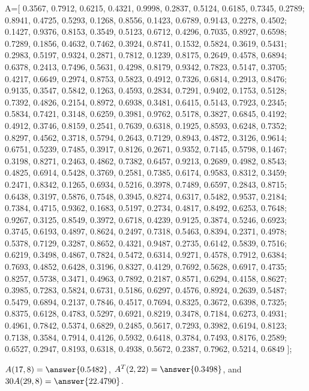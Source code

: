 \documentclass{ximera}
\begin{document}
\begin{exercise}
\begin{enumerate}
\begin{hint}
    A=[
  0.3567, 0.7912, 0.6215, 0.4321, 0.9998, 0.2837, 0.5124, 0.6185, 0.7345, 0.2789;
  0.8941, 0.4725, 0.5293, 0.1268, 0.8556, 0.1423, 0.6789, 0.9143, 0.2278, 0.4502;
  0.1427, 0.9376, 0.8153, 0.3549, 0.5123, 0.6712, 0.4296, 0.7035, 0.8927, 0.6598;
  0.7289, 0.1856, 0.4632, 0.7462, 0.3924, 0.8741, 0.1532, 0.5824, 0.3619, 0.5431;
  0.2983, 0.5197, 0.9324, 0.2871, 0.7812, 0.1239, 0.8175, 0.2649, 0.4578, 0.6894;
  0.6378, 0.2413, 0.7496, 0.5631, 0.4298, 0.8179, 0.9342, 0.7823, 0.5147, 0.3705;
  0.4217, 0.6649, 0.2974, 0.8753, 0.5823, 0.4912, 0.7326, 0.6814, 0.2913, 0.8476;
  0.9135, 0.3547, 0.5842, 0.1263, 0.4593, 0.2834, 0.7291, 0.9402, 0.1753, 0.5128;
  0.7392, 0.4826, 0.2154, 0.8972, 0.6938, 0.3481, 0.6415, 0.5143, 0.7923, 0.2345;
  0.5834, 0.7421, 0.3148, 0.6259, 0.3981, 0.9762, 0.5178, 0.3827, 0.6845, 0.4192;
  0.4912, 0.3746, 0.8159, 0.2541, 0.7639, 0.6318, 0.1925, 0.8593, 0.6248, 0.7352;
  0.8297, 0.4562, 0.3718, 0.5794, 0.2643, 0.7129, 0.8943, 0.4872, 0.3126, 0.9614;
  0.6751, 0.5239, 0.7485, 0.3917, 0.8126, 0.2671, 0.9352, 0.7145, 0.5798, 0.1467;
  0.3198, 0.8271, 0.2463, 0.4862, 0.7382, 0.6457, 0.9213, 0.2689, 0.4982, 0.8543;
  0.4825, 0.6914, 0.5428, 0.3769, 0.2581, 0.7385, 0.6174, 0.9583, 0.8312, 0.3459;
  0.2471, 0.8342, 0.1265, 0.6934, 0.5216, 0.3978, 0.7489, 0.6597, 0.2843, 0.8715;
  0.6438, 0.3197, 0.5876, 0.7548, 0.3945, 0.8274, 0.6317, 0.5482, 0.9537, 0.2184;
  0.7384, 0.4715, 0.9362, 0.1683, 0.5197, 0.2734, 0.4817, 0.8492, 0.6253, 0.7648;
  0.9267, 0.3125, 0.8549, 0.3972, 0.6718, 0.4239, 0.9125, 0.3874, 0.5246, 0.6923;
  0.3745, 0.6193, 0.4897, 0.8624, 0.2497, 0.7318, 0.5463, 0.8394, 0.2371, 0.4978;
  0.5378, 0.7129, 0.3287, 0.8652, 0.4321, 0.9487, 0.2735, 0.6142, 0.5839, 0.7516;
    0.6219, 0.3498, 0.4867, 0.7824, 0.5472, 0.6314, 0.9271, 0.4578, 0.7912, 0.6384;
    0.7693, 0.4852, 0.6428, 0.3196, 0.8327, 0.4129, 0.7692, 0.5628, 0.6917, 0.4735;
    0.8257, 0.5738, 0.3471, 0.4963, 0.7892, 0.2187, 0.8571, 0.6294, 0.4158, 0.8627;
    0.3985, 0.7283, 0.5824, 0.6731, 0.5186, 0.6297, 0.4576, 0.8924, 0.2639, 0.5487;
    0.5479, 0.6894, 0.2137, 0.7846, 0.4517, 0.7694, 0.8325, 0.3672, 0.6398, 0.7325;
    0.8375, 0.6128, 0.4783, 0.5297, 0.6921, 0.8219, 0.3478, 0.7184, 0.6273, 0.4931;
    0.4961, 0.7842, 0.5374, 0.6829, 0.2485, 0.5617, 0.7293, 0.3982, 0.6194, 0.8123;
    0.7138, 0.3584, 0.7914, 0.4126, 0.5932, 0.6418, 0.3784, 0.7493, 0.8176, 0.2589;
    0.6527, 0.2947, 0.8193, 0.6318, 0.4938, 0.5672, 0.2387, 0.7962, 0.5214, 0.6849
];

  \end{hint}

$A(17,8)=\answer{0.5482}$, $A^T(2,22)=\answer{0.3498}$, and $30A(29,8)=\answer{22.4790}$.

\end{enumerate}

\end{exercise}
\end{document}
